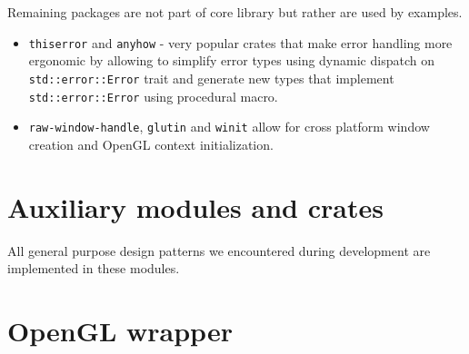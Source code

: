 Remaining packages are not part of core library but rather are used by examples.

\begin{itemize}
    \item \texttt{thiserror} and \texttt{anyhow} - very popular crates that make error handling more ergonomic by allowing to simplify error types using dynamic dispatch on \texttt{std::error::Error} trait and generate new types that implement \texttt{std::error::Error} using procedural macro.
    \item \texttt{raw-window-handle}, \texttt{glutin} and \texttt{winit} allow for cross platform window creation and OpenGL context initialization.
\end{itemize}

\section{Auxiliary modules and crates}

All general purpose design patterns we encountered during development are implemented in these modules.

\section{OpenGL wrapper}
